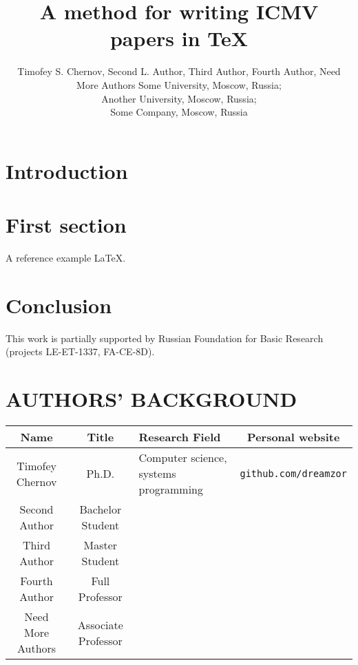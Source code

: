 \documentclass{spie}
\title{A method for writing ICMV papers in TeX}
\author{Timofey S. Chernov\supit{1,3}, Second L. Author\supit{2}, Third Author\supit{3}, 		
        \skiplinehalf
        Fourth Author\supit{1,2}, Need More Authors\supit{1,2,3}
  \skiplinehalf
  \normalsize 
  \supit{1}Some University, Moscow, Russia; \\
  \supit{2}Another University, Moscow, Russia; \\
  \supit{3}Some Company, Moscow, Russia
}
\begin{document}
\maketitle

\begin{abstract}
  \lipsum[6]
  
\end{abstract}

\section{Introduction}

\lipsum[1]

\section{First section}

A reference example \LaTeX \cite{fourier_applications}.

\section{Conclusion}

\lipsum[42]

\acknowledgements

This work is partially supported by Russian Foundation for Basic Research (projects LE-ET-1337, FA-CE-8D). 





\clearpage

\section*{AUTHORS' BACKGROUND}

\begin{table}[h]
	\centering
	\begin{tabular}{ | c | c | p{45mm} | c | } \hline
		Name & Title & \centering Research Field & Personal website \\
		\hline
		Timofey Chernov & Ph.D. & Computer science, systems programming & \texttt{github.com/dreamzor} \\
		\hline
		Second Author & Bachelor Student &  & \\
 		\hline
 		Third Author & Master Student &  & \\
 		\hline
 		Fourth Author & Full Professor &  & \\
  	\hline
 		Need More Authors & Associate Professor &  & \\
		\hline
	\end{tabular}
\end{table}
\end{document}
